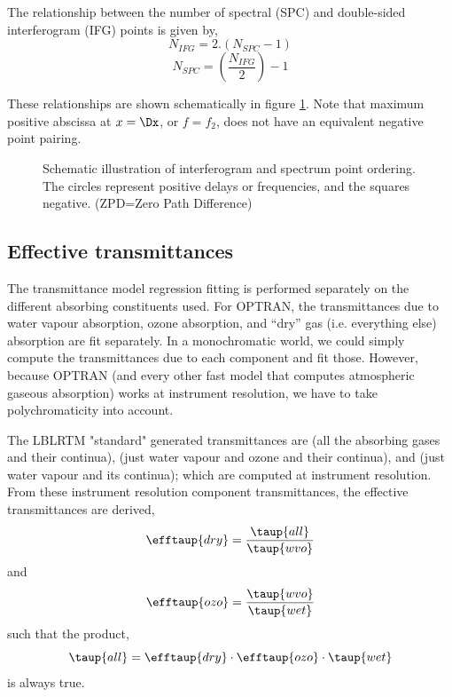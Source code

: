 The relationship between the number of spectral (SPC) and double-sided interferogram (IFG) points is given by,
\begin{equation}N_{IFG} = 2.(N_{SPC}-1)\end{equation}
\begin{equation}N_{SPC} = \left(\frac{N_{IFG}}{2}\right) - 1\end{equation}

These relationships are shown schematically in figure \ref{fig:X_F_defn}. Note that maximum positive abscissa at $x = \Dx$, or $f = f_{2}$, does not have an equivalent negative point pairing.
\begin{figure}[htp]
  \centering
  
  \caption{Schematic illustration of interferogram and spectrum point ordering. The circles represent positive delays or frequencies, and the squares negative. (ZPD=Zero Path Difference)}
  \label{fig:X_F_defn}
\end{figure}


\subsection{Effective transmittances}
\label{sec:efftau}
The transmittance model regression fitting is performed separately on the different absorbing constituents used. For OPTRAN, the transmittances due to water vapour absorption, ozone absorption, and ``dry'' gas (i.e. everything else) absorption are fit separately. In a monochromatic world, we could simply compute the transmittances due to each component and fit those. However, because OPTRAN (and every other fast model that computes atmospheric gaseous absorption) works at instrument resolution, we have to take polychromaticity into account.

The LBLRTM "standard" generated transmittances are  (all the absorbing gases and their continua),  (just water vapour and ozone and their continua), and  (just water vapour and its continua); which are computed at instrument resolution. From these instrument resolution component transmittances, the effective transmittances are derived,
\begin{equation}
  \efftaup{dry} = \frac{\taup{all}}{\taup{wvo}}
  \label{eqn:tau_effdry}
\end{equation}
and
\begin{equation}
  \efftaup{ozo} = \frac{\taup{wvo}}{\taup{wet}}
  \label{eqn:tau_effozo}
\end{equation}
such that the product,
\begin{equation}
  \taup{all} = \efftaup{dry}\cdot\efftaup{ozo}\cdot\taup{wet}
  \label{eqn:tau_all}
\end{equation}
is always true.


